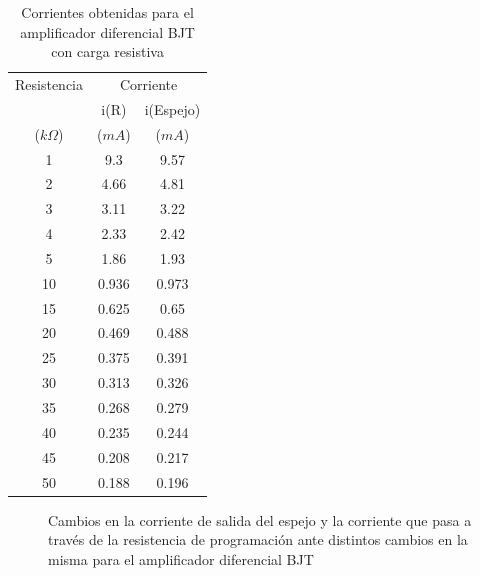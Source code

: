 \begin{table}[H]
\centering
\caption{Corrientes obtenidas para el amplificador diferencial BJT con carga resistiva}
\label{espejodiferencialbjt}
\begin{tabular}{ccc}
\hline 
Resistencia          & \multicolumn{2}{c}{Corriente}                \\
                     & i(R)                 & i(Espejo)             \\
($k\Omega$)          & ($mA$)               & ($mA$)                 \\
\hline 
\hline 
1	&	9.3	    &	9.57	\\
2	&	4.66	&	4.81	\\
3	&	3.11	&	3.22	\\
4	&	2.33	&	2.42	\\
5	&	1.86	&	1.93	\\
10	&	0.936	&	0.973	\\
15	&	0.625	&	0.65	\\
20	&	0.469	&	0.488	\\
25	&	0.375	&	0.391	\\
30	&	0.313	&	0.326	\\
35	&	0.268	&	0.279	\\
40	&	0.235	&	0.244	\\
45	&	0.208	&	0.217	\\
50	&	0.188	&	0.196	\\
\hline 
\end{tabular}
\end{table}
\begin{figure}[H]

\centering


\caption{Cambios en la corriente de salida del espejo y la corriente que pasa a través de la resistencia de programación ante distintos cambios en la misma para el amplificador diferencial BJT}
\label{espejodiferencialbjtfigura}

\end{figure}

